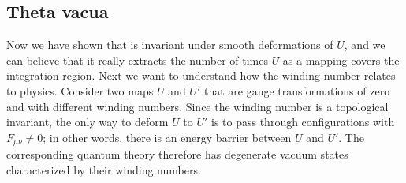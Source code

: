\subsection{Theta vacua}
Now we have shown that  is invariant under smooth deformations
of $U$, and we can believe that it really extracts the number of times
$U$ as a mapping covers the integration region. Next we want to understand
how the winding number relates to physics. 
Consider two maps $U$ and $U'$ that are gauge transformations of
zero and with different winding numbers. Since the winding number
is a topological invariant, the only way to deform $U$ to $U'$ is
to pass through configurations with $F_{\mu\nu}\neq0$; in other
words, there is an energy barrier between $U$ and $U'$. 
The corresponding quantum theory therefore has degenerate
vacuum states characterized by their winding numbers.

